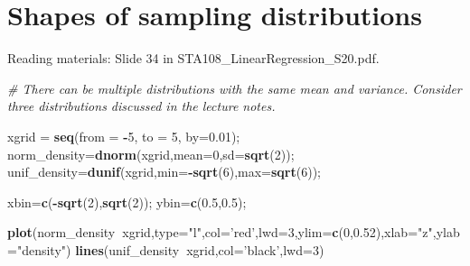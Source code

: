\documentclass[12pt,]{book}
\newenvironment{Shaded}{\begin{snugshade}}{\end{snugshade}}
\newcommand{\KeywordTok}[1]{\textcolor[rgb]{0.13,0.29,0.53}{\textbf{#1}}}
\newcommand{\DataTypeTok}[1]{\textcolor[rgb]{0.13,0.29,0.53}{#1}}
\newcommand{\DecValTok}[1]{\textcolor[rgb]{0.00,0.00,0.81}{#1}}
\newcommand{\FloatTok}[1]{\textcolor[rgb]{0.00,0.00,0.81}{#1}}
\newcommand{\StringTok}[1]{\textcolor[rgb]{0.31,0.60,0.02}{#1}}
\newcommand{\CommentTok}[1]{\textcolor[rgb]{0.56,0.35,0.01}{\textit{#1}}}
\newcommand{\OperatorTok}[1]{\textcolor[rgb]{0.81,0.36,0.00}{\textbf{#1}}}
\newcommand{\NormalTok}[1]{#1}
\begin{document}
\section{Shapes of sampling
distributions}\label{shapes-of-sampling-distributions}

Reading materials: Slide 34 in STA108\_LinearRegression\_S20.pdf.

\begin{Shaded}
\begin{Highlighting}[]
\CommentTok{# There can be multiple distributions with the same mean and variance. Consider three distributions discussed in the lecture notes.}

\NormalTok{xgrid =}\StringTok{ }\KeywordTok{seq}\NormalTok{(}\DataTypeTok{from =} \OperatorTok{-}\DecValTok{5}\NormalTok{, }\DataTypeTok{to =} \DecValTok{5}\NormalTok{, }\DataTypeTok{by=}\FloatTok{0.01}\NormalTok{);}
\NormalTok{norm_density=}\KeywordTok{dnorm}\NormalTok{(xgrid,}\DataTypeTok{mean=}\DecValTok{0}\NormalTok{,}\DataTypeTok{sd=}\KeywordTok{sqrt}\NormalTok{(}\DecValTok{2}\NormalTok{));}
\NormalTok{unif_density=}\KeywordTok{dunif}\NormalTok{(xgrid,}\DataTypeTok{min=}\OperatorTok{-}\KeywordTok{sqrt}\NormalTok{(}\DecValTok{6}\NormalTok{),}\DataTypeTok{max=}\KeywordTok{sqrt}\NormalTok{(}\DecValTok{6}\NormalTok{));}

\NormalTok{xbin=}\KeywordTok{c}\NormalTok{(}\OperatorTok{-}\KeywordTok{sqrt}\NormalTok{(}\DecValTok{2}\NormalTok{),}\KeywordTok{sqrt}\NormalTok{(}\DecValTok{2}\NormalTok{));}
\NormalTok{ybin=}\KeywordTok{c}\NormalTok{(}\FloatTok{0.5}\NormalTok{,}\FloatTok{0.5}\NormalTok{);}


\KeywordTok{plot}\NormalTok{(norm_density}\OperatorTok{~}\NormalTok{xgrid,}\DataTypeTok{type=}\StringTok{"l"}\NormalTok{,}\DataTypeTok{col=}\StringTok{'red'}\NormalTok{,}\DataTypeTok{lwd=}\DecValTok{3}\NormalTok{,}\DataTypeTok{ylim=}\KeywordTok{c}\NormalTok{(}\DecValTok{0}\NormalTok{,}\FloatTok{0.52}\NormalTok{),}\DataTypeTok{xlab=}\StringTok{"z"}\NormalTok{,}\DataTypeTok{ylab=}\StringTok{"density"}\NormalTok{)}
\KeywordTok{lines}\NormalTok{(unif_density}\OperatorTok{~}\NormalTok{xgrid,}\DataTypeTok{col=}\StringTok{'black'}\NormalTok{,}\DataTypeTok{lwd=}\DecValTok{3}\NormalTok{)}


\end{Highlighting}
\end{Shaded}
\end{document}
